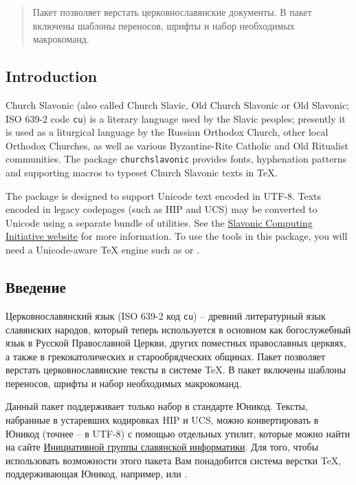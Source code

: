 \begin{RU}
\begin{abstract}
Пакет  позволяет верстать церковнославянские документы. В пакет включены шаблоны переносов,
шрифты и набор необходимых макрокоманд.
\end{abstract}
\end{RU}

\tableofcontents

\begin{EN}
\section*{Introduction}
Church Slavonic (also called Church Slavic, Old Church Slavonic
or Old Slavonic; ISO 639-2 code \texttt{cu}) is a literary language used by
the Slavic peoples; presently it is used as a liturgical language by the
Russian Orthodox Church, other local Orthodox Churches, as well
as various Byzantine-Rite Catholic and Old Ritualist communities.
The package \texttt{churchslavonic} provides fonts, hyphenation
patterns and supporting macros to typeset
Church Slavonic texts in \TeX{}.

The package is designed to support Unicode text encoded in UTF-8.
Texts encoded in legacy codepages (such as HIP and UCS) may be
converted to Unicode using a separate bundle of utilities.
See the \href{http://sci.ponomar.net/}
{Slavonic Computing Initiative website} for more information.
To use the tools in this package, you will need a Unicode-aware \TeX{}
engine such as \XeTeX{} or \LuaTeX{}.
\end{EN}

\begin{RU}
\section*{Введение}
Церковнославянский язык (ISO 639-2 код \texttt{cu}) --
древний литературный язык славянских народов,
который теперь используется в основном как богослужебный язык
в Русской Православной Церкви, других поместных православных
церквях, а также в грекокатолических и старообрядческих общинах.
Пакет  позволяет верстать церковнославянские тексты
в системе \TeX{}. В пакет включены шаблоны переносов,
шрифты и набор необходимых макрокоманд.

Данный пакет поддерживает только набор в стандарте Юникод.
Тексты, набранные в устаревших кодировках HIP и UCS,
можно конвертировать в Юникод (точнее -- в UTF-8) с помощью
отдельных утилит, которые можно найти на сайте
\href{http://sci.ponomar.net/}
{Инициативной группы славянской информатики}.
Для того, чтобы использовать возможности этого пакета Вам
понадобится система верстки \TeX{}, поддерживающая Юникод,
например, \XeTeX{} или \LuaTeX{}.
\end{RU}

